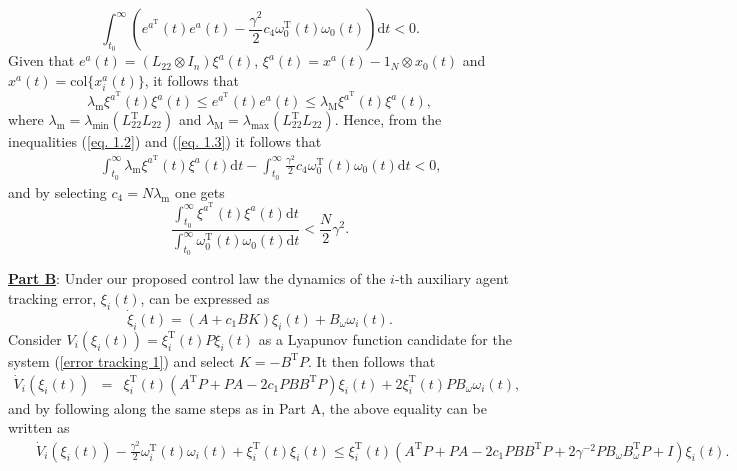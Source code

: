\documentclass[12pt,draftcls,onecolumn]{IEEEtran}
\begin{document}
\begin{equation}
\int_{t_0}^{\infty}( e^{a^{\text{T}}}(t)e^a(t)-\frac{\gamma^2}{2}c_4\omega_0^{\text{T}}(t)\omega_0(t)) \text{d}t<0.\label{eq. 1.2}
\end{equation}
Given that $e^a(t)=(L_{22}\otimes I_n) \xi^a(t)$, 
		 $\xi^a(t)=x^a(t)-1_N\otimes x_0(t)$ and $x^a(t)=\text{col}\{x_i^a(t)\}$,   it follows that  
\begin{equation}
\lambda_{\text{m}}\xi^{a^{\text{T}}}(t)\xi^a(t) \leq e^{a^{\text{T}}}(t)e^a(t)\leq \lambda_{\text{M}}\xi^{a^{\text{T}}}(t)\xi^a(t), \label{eq. 1.3}
\end{equation}
where $\lambda_{\text{m}}=\lambda_{\text{min}}(L_{22}^{\text{T}}L_{22})$ and $\lambda_{\text{M}}=\lambda_{\text{max}}(L_{22}^{\text{T}}L_{22})$.  Hence, from the inequalities (\ref{eq. 1.2}) and (\ref{eq. 1.3}) it follows that  
\begin{eqnarray*}
	&&\int_{t_0}^{\infty}  \lambda_{\text{m}}\xi^{a^{\text{T}}}(t)\xi^a(t)\text{d}t  -\int_{t_0}^{\infty}\frac{\gamma^2}{2}c_4\omega_0^{\text{T}}(t)\omega_0(t) \text{d}t <0,
\end{eqnarray*}
and by selecting $c_4=N\lambda_{\text{m}}$ one gets  
\begin{equation}
\frac{\int_{t_0}^{\infty} \xi^{a^{\text{T}}}(t)\xi^a(t)\text{d}t} {\int_{t_0}^{\infty}\omega_0^{\text{T}}(t)\omega_0(t) \text{d}t} <\frac{N}{2}\gamma^2.\label{eq. 1.6}
\end{equation}\par
\underline{\textbf{Part B}}: Under our proposed  control law the dynamics of the $i$-th auxiliary agent tracking error, $\xi_i(t)$, can be expressed as 
\begin{equation}
\dot \xi_i(t)=(A+c_1 BK) \xi_i(t)+ {B}_{\omega}\omega_i(t).\label{error tracking 1}
\end{equation}
Consider $V_i(\xi_i(t))=\xi_i^{\text{T}}(t) P\xi_i(t)$ as a Lyapunov function candidate for the system (\ref{error tracking 1}) and  select $K=-B^{\text{T}}P$. It then follows that 
\begin{eqnarray*}
	\dot V_i(\xi_i(t))&=& \xi_i^{\text{T}}(t)(A^{\text{T}}P+PA-2c_1 PBB^{\text{T}}P)\xi_i(t)+2 \xi_i^{\text{T}}(t) PB_{\omega}\omega_i(t),
\end{eqnarray*}
and by following along the same steps as in Part A, the above equality can be written as 
\begin{eqnarray*}
	&&\dot V_i(\xi_i(t))-\frac{\gamma^2}{2}\omega_i^{\text{T}}(t)\omega_i(t)+\xi_i^{\text{T}}(t)\xi_i(t)\leq \xi_i^{\text{T}}(t)(A^{\text{T}}P+PA-2c_1 PBB^{\text{T}}P+{2}{\gamma^{-2}}PB_{\omega}B_{\omega}^{\text{T}}P+I)\xi_i(t).
\end{eqnarray*}
\end{document}
